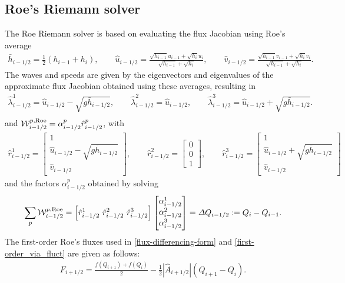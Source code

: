 \documentclass[preprint, 11pt]{article}
\newcommand{\W}{{\mathcal W}}
\newcommand{\imh}{{i-1/2}}
\newcommand{\bff}{{f}}
\newcommand{\bfr}{{r}}
\newcommand{\bfF}{{F}}
\newcommand{\bfq}{{Q}}
\newcommand{\Roe}{{\rm Roe}}
\begin{document}
\subsection{Roe's Riemann solver} \label{sec:roe}
The Roe Riemann solver is based on evaluating the flux Jacobian using Roe's average
\begin{align}\label{roe_average}
  \bar h_{i-1/2}=\frac{1}{2}(h_{i-1}+h_i), \qquad
  \hat u_{i-1/2}=\frac{\sqrt{h_{i-1}}u_{i-1}+\sqrt{h_i}u_i}{\sqrt{h_{i-1}}+\sqrt{h_i}}, \qquad
  \hat v_{i-1/2}=\frac{\sqrt{h_{i-1}}v_{i-1}+\sqrt{h_i}v_i}{\sqrt{h_{i-1}}+\sqrt{h_i}}.
\end{align}
The waves and speeds are given by the eigenvectors and eigenvalues of the approximate
flux Jacobian obtained using these averages, resulting in
\begin{align*}
  \hat\lambda_{i-1/2}^1=\hat u_{i-1/2}-\sqrt{g\bar h_{i-1/2}}, \qquad
  \hat\lambda_{i-1/2}^2=\hat u_{i-1/2}, \qquad
  \hat\lambda_{i-1/2}^3=\hat u_{i-1/2}+\sqrt{g\bar h_{i-1/2}}. \\
\end{align*}
and $\W_{i-1/2}^{p,\Roe}=\alpha_{i-1/2}^p\hat r_{i-1/2}^p$, with
\begin{align*}
  \hat \bfr^1_{i-1/2} =
  \begin{bmatrix}
    1 \\
    \hat u_{i-1/2}-\sqrt{g\bar h_{i-1/2}}\\
    \hat v_{i-1/2}
  \end{bmatrix},
  \qquad
  \hat \bfr^2_{i-1/2} =
  \begin{bmatrix}
    0\\
    0\\
    1
  \end{bmatrix},
  \qquad
  \hat \bfr^3_{i-1/2} =
  \begin{bmatrix}
    1 \\
    \hat u_{i-1/2}+\sqrt{g\bar h_{i-1/2}}\\
    \hat v_{i-1/2}
  \end{bmatrix}
\end{align*}
and the factors $\alpha^p_\imh$ obtained by solving
\begin{align}\label{system_for_alphas}
  \sum_p\W_{i-1/2}^{p,\Roe} = \left[\hat \bfr^1_{i-1/2} ~\hat \bfr^2_{i-1/2} ~\hat \bfr^3_{i-1/2}\right]
  \begin{bmatrix}
    \alpha^1_{i-1/2} \\
    \alpha^2_{i-1/2} \\
    \alpha^3_{i-1/2}
  \end{bmatrix}
  =\Delta Q_{i-1/2}:=\bfq_i-\bfq_{i-1}.
\end{align}
The first-order Roe's fluxes used in \eqref{flux-differencing-form} and \eqref{first-order_via_fluct} are given as follows:
\begin{align}\label{first-order_fluxes_Roe}
  \bfF_{i+1/2} = \frac{\bff(\bfq_{i+1})+\bff(\bfq_i)}{2} - \frac{1}{2} |\hat A_{i+1/2}|(\bfq_{i+1}-\bfq_{i}).
\end{align}
\end{document}
